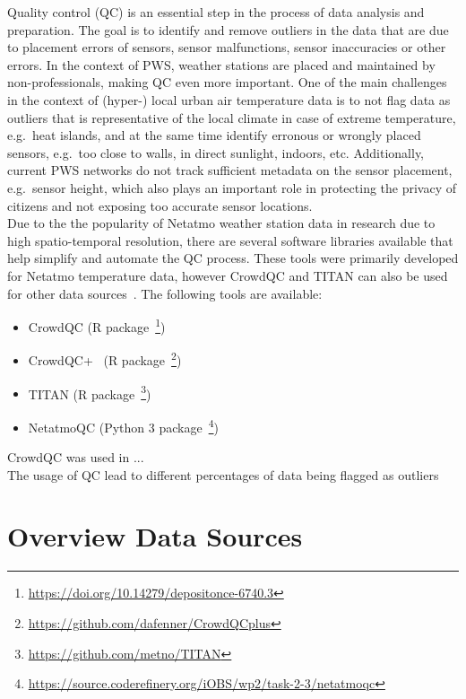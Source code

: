 Quality control (QC) is an essential step in the process of data analysis and preparation. The goal is to identify and remove outliers in the data that are due to placement errors of sensors, sensor malfunctions, sensor inaccuracies or other errors. In the context of PWS, weather stations are placed and maintained by non-professionals, making QC even more important. One of the main challenges in the context of (hyper-) local urban air temperature data is to not flag data as outliers that is representative of the local climate in case of extreme temperature, e.g.\ heat islands, and at the same time identify erronous or wrongly placed sensors, e.g.\ too close to walls, in direct sunlight, indoors, etc. Additionally, current PWS networks do not track sufficient metadata on the sensor placement, e.g.\ sensor height, which also plays an important role in protecting the privacy of citizens and not exposing too accurate sensor locations.\\
Due to the the popularity of Netatmo weather station data in research due to high spatio-temporal resolution, there are several 
software libraries available that help simplify and automate the QC process. These tools were primarily developed for Netatmo temperature data, however CrowdQC and TITAN can also be used for other data sources~\cite{hahn2022observations}. The following tools are available:

\begin{itemize}
    \item CrowdQC (R package~\footnote{\url{https://doi.org/10.14279/depositonce-6740.3}})
    \item CrowdQC+~\cite{fenner2021crowdqc+} (R package~\footnote{\url{https://github.com/dafenner/CrowdQCplus}})
    \item TITAN (R package~\footnote{\url{https://github.com/metno/TITAN}})
    \item NetatmoQC (Python 3 package~\footnote{\url{https://source.coderefinery.org/iOBS/wp2/task-2-3/netatmoqc}})
\end{itemize}

CrowdQC was used in ...\\ %
The usage of QC lead to different percentages of data being flagged as outliers

\section{Overview Data Sources}

